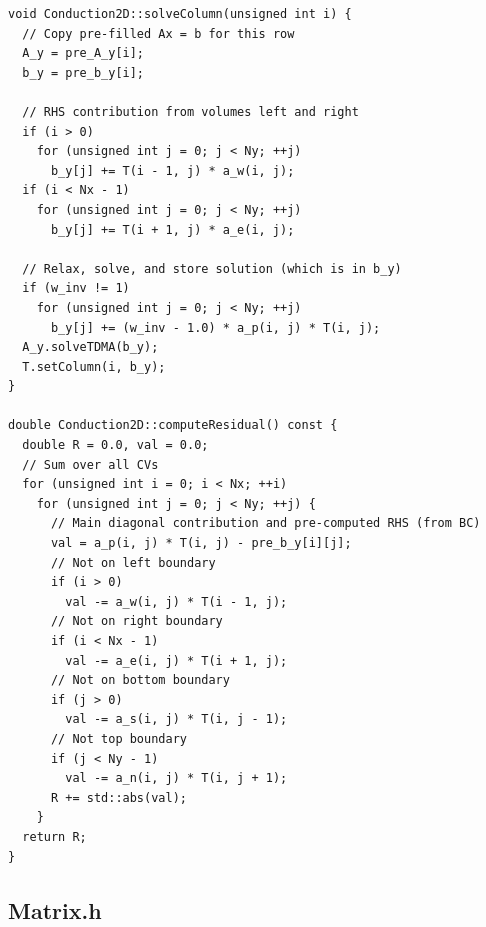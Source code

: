 \documentclass{article}
\begin{document}
\begin{verbatim}
void Conduction2D::solveColumn(unsigned int i) {
  // Copy pre-filled Ax = b for this row
  A_y = pre_A_y[i];
  b_y = pre_b_y[i];

  // RHS contribution from volumes left and right
  if (i > 0)
    for (unsigned int j = 0; j < Ny; ++j)
      b_y[j] += T(i - 1, j) * a_w(i, j);
  if (i < Nx - 1)
    for (unsigned int j = 0; j < Ny; ++j)
      b_y[j] += T(i + 1, j) * a_e(i, j);

  // Relax, solve, and store solution (which is in b_y)
  if (w_inv != 1)
    for (unsigned int j = 0; j < Ny; ++j)
      b_y[j] += (w_inv - 1.0) * a_p(i, j) * T(i, j);
  A_y.solveTDMA(b_y);
  T.setColumn(i, b_y);
}

double Conduction2D::computeResidual() const {
  double R = 0.0, val = 0.0;
  // Sum over all CVs
  for (unsigned int i = 0; i < Nx; ++i)
    for (unsigned int j = 0; j < Ny; ++j) {
      // Main diagonal contribution and pre-computed RHS (from BC)
      val = a_p(i, j) * T(i, j) - pre_b_y[i][j];
      // Not on left boundary
      if (i > 0)
        val -= a_w(i, j) * T(i - 1, j);
      // Not on right boundary
      if (i < Nx - 1)
        val -= a_e(i, j) * T(i + 1, j);
      // Not on bottom boundary
      if (j > 0)
        val -= a_s(i, j) * T(i, j - 1);
      // Not top boundary
      if (j < Ny - 1)
        val -= a_n(i, j) * T(i, j + 1);
      R += std::abs(val);
    }
  return R;
}

\end{verbatim}

\subsection*{Matrix.h}
\end{document}
